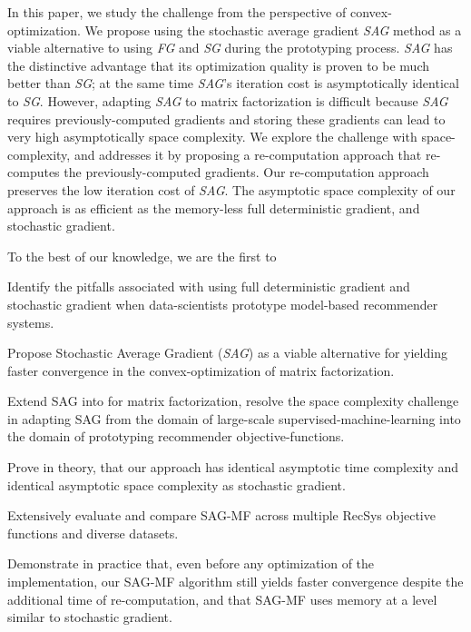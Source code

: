 In this paper, we study the challenge from the perspective of convex-optimization.  
We propose using the stochastic average gradient \emph{SAG} method \cite{schmidt2013minimizing, roux2012stochastic} as a viable alternative to using \emph{FG} and \emph{SG} during the prototyping process.  
\emph{SAG} has the distinctive advantage that its optimization quality is proven to be much better than \emph{SG}; at the same time \emph{SAG}'s iteration cost is asymptotically identical to \emph{SG}.  
However, adapting \emph{SAG} to matrix factorization is difficult because \emph{SAG} requires previously-computed gradients and storing these gradients can lead to very high asymptotically space complexity.  
We explore the challenge with space-complexity, and addresses it by proposing a re-computation approach \tool that re-computes the previously-computed gradients.  
Our re-computation approach preserves the low iteration cost of \emph{SAG}.  
The asymptotic space complexity of our \tool approach is as efficient as the memory-less full deterministic gradient, and stochastic gradient.  

To the best of our knowledge, we are the first to
\begin{compactitem}
\item Identify the pitfalls associated with using full deterministic gradient and stochastic gradient when data-scientists prototype model-based recommender systems.  
\item Propose Stochastic Average Gradient (\emph{SAG}) as a viable alternative for yielding faster convergence in the convex-optimization of matrix factorization.  
\item Extend SAG into \tool for matrix factorization, resolve the space complexity challenge in adapting SAG from the domain of large-scale supervised-machine-learning into the domain of prototyping recommender objective-functions.  
\item Prove in theory, that our \tool approach has identical asymptotic time complexity and identical asymptotic space complexity as stochastic gradient.  
\item Extensively evaluate and compare SAG-MF across multiple RecSys objective functions and diverse datasets.  
\item Demonstrate in practice that, even before any optimization of the implementation, our SAG-MF algorithm still yields faster convergence despite the additional time of re-computation, and that SAG-MF uses memory at a level similar to stochastic gradient.  
\end {compactitem}
